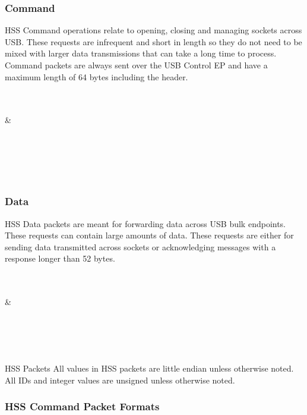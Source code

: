 \documentclass[10pt]{article}
\begin{document}
	\subsubsection{Command}
	HSS Command operations relate to opening, closing and managing sockets across USB. These requests are infrequent and short in length so they do not need to be mixed with larger data transmissions that can take a long time to process. Command packets are always sent over the USB Control EP and have a maximum length of 64 bytes including the header.\\
	\\
	\begin{bytefield}[bitwidth=1.7em]{32}
		 \\
		 &
		 \\
		 \\
		 \\
		 \\
	\end{bytefield}\\ 
	\subsubsection{Data}
	HSS Data packets are meant for forwarding data across USB bulk endpoints. These requests can contain large amounts of data. These requests are either for sending data transmitted across sockets or acknowledging messages with a response longer than 52 bytes.\\
	\\
	\begin{bytefield}[bitwidth=1.7em]{32}
		 \\
		 &
		 \\
		 \\
		 \\
		 \\
	\end{bytefield}\\
	{HSS Packets} \mbox{}
	All values in HSS packets are little endian unless otherwise noted. All IDs and integer values are unsigned unless otherwise noted.
	\subsubsection{HSS Command Packet Formats}
	\setcounter{secnumdepth}{5}
\end{document}
